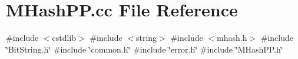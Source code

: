 \section{M\+Hash\+P\+P.\+cc File Reference}
\label{MHashPP_8cc}
{\ttfamily \#include $<$cstdlib$>$}\newline
{\ttfamily \#include $<$string$>$}\newline
{\ttfamily \#include $<$mhash.\+h$>$}\newline
{\ttfamily \#include \char`\"{}Bit\+String.\+h\char`\"{}}\newline
{\ttfamily \#include \char`\"{}common.\+h\char`\"{}}\newline
{\ttfamily \#include \char`\"{}error.\+h\char`\"{}}\newline
{\ttfamily \#include \char`\"{}M\+Hash\+P\+P.\+h\char`\"{}}\newline
